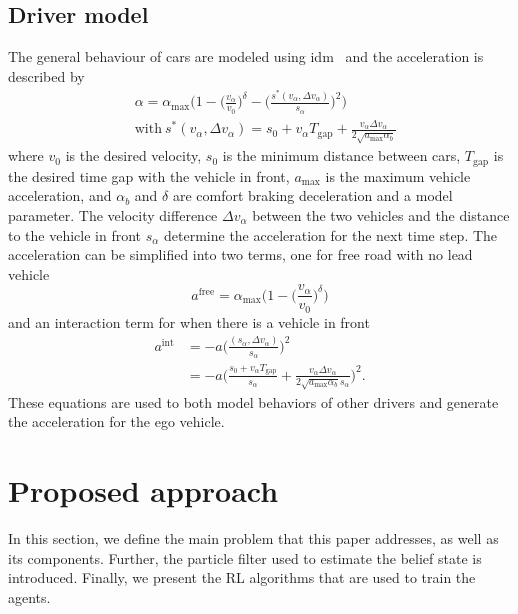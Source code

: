 \subsection{Driver model}
\label{sec:driver_model}
The general behaviour of cars are modeled using \gls{idm}~\cite{idm2000} and the acceleration is described by
\begin{align*}
    & \alpha = \alpha_{\mathrm{max}}\Big(1-\Big(\frac{v_\alpha}{v_0}\Big)^\delta-\Big( \frac{s^*(v_\alpha,\Delta v_\alpha)}{s_\alpha}\Big)^2\Big) \\
    & \mathrm{with ~} s^*(v_\alpha, \Delta v_\alpha) = s_0 + v_\alpha T_{\mathrm{gap}} + \frac{v_\alpha \Delta v_\alpha}{2 \sqrt{a_{\mathrm{max}} \alpha_b}}
\end{align*}
where $v_0$ is the desired velocity, $s_0$ is the minimum distance between cars, $T_{\mathrm{gap}}$ is the desired time gap with the vehicle in front, $a_\mathrm{max}$ is the maximum vehicle acceleration, and $\alpha_b$ and $\delta$ are comfort braking deceleration and a model parameter. The velocity difference $\Delta v_\alpha$ between the two vehicles and the distance to the vehicle in front $s_\alpha$ determine the acceleration for the next time step. 
The acceleration can be simplified into two terms, one for free road with no lead vehicle
\begin{equation}
    a^\text{free}= \alpha_\mathrm{max}\Big(1-\Big(\frac{v_\alpha}{v_0}\Big)^\delta\Big)
    \label{eq:idm_free}
\end{equation}
and an interaction term for when there is a vehicle in front 
\begin{align}
     a^\text{int} &=  -a \Big(\frac{(s_\alpha,\Delta v_\alpha)}{s_\alpha} \Big) ^2 \\
     &= -a \Big(\frac{s_0 + v_\alpha T_{\mathrm{gap}}}{s_\alpha} + \frac{v_\alpha \Delta v_\alpha}{2 \sqrt{a_{\mathrm{max}} \alpha_b} s_\alpha} \Big) ^2.
     \label{eq:idm_int}
\end{align}
These equations are used to both model behaviors of other drivers and generate the acceleration for the ego vehicle.

\section{Proposed approach}
\label{sec:approach}

In this section, we define the main problem that this paper addresses, as well as its components. Further, the particle filter used to estimate the belief state is introduced. Finally, we present the RL algorithms that are used to train the agents.


